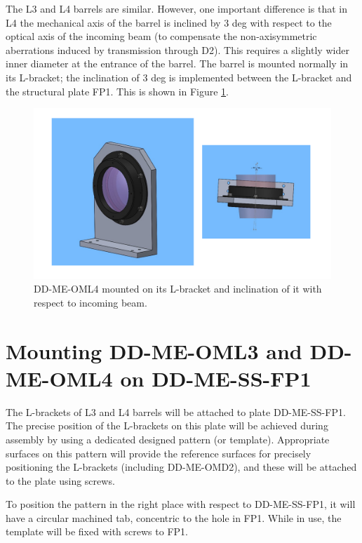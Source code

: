 \documentclass{report}
\begin{document}
The L3 and L4 barrels are similar. However, one important difference is that in L4 the mechanical axis of the barrel is inclined by 3 deg with respect to the optical axis of the incoming beam (to compensate the non-axisymmetric aberrations induced by transmission through D2). This requires a slightly wider inner diameter at the entrance of the barrel. The barrel is mounted normally in its L-bracket; the inclination of 3 deg is implemented between the L-bracket and the structural plate FP1. This is shown in Figure \ref{figure:OML4-br}. 

\begin{figure}
\begin{center}
\includegraphics[width=1.1\linewidth]{figures/DD-ME-OML4-BR.png}
\end{center}
\caption{DD-ME-OML4 mounted on its L-bracket and inclination of it with respect to incoming beam.}
\label{figure:OML4-br}
\end{figure}

\section{Mounting DD-ME-OML3 and DD-ME-OML4 on DD-ME-SS-FP1}

The L-brackets of L3 and L4 barrels will be attached to plate DD-ME-SS-FP1. The precise position of the L-brackets on this plate will be achieved during assembly by using a dedicated designed pattern (or template). Appropriate surfaces on this pattern will provide the reference surfaces for precisely positioning the L-brackets (including DD-ME-OMD2), and these will be attached to the plate using screws.

To position the pattern in the right place with respect to DD-ME-SS-FP1, it will have a circular machined tab, concentric to the hole in FP1. While in use, the template will be fixed with screws to FP1. 
\end{document}
